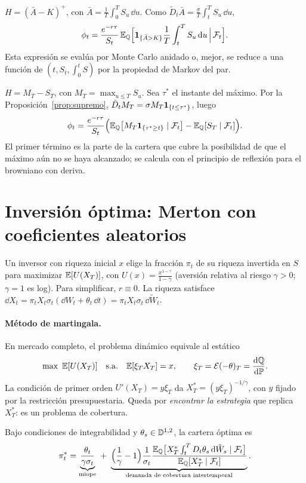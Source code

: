 \begin{ejemplo}[Asiática]
$H=(\bar A-K)^+$, con $\bar A=\frac1T\int_0^TS_u\,\dd u$. Como $\tilde D_t\bar A=\frac\sigma T\int_t^TS_u\,\dd u$,
\[
  \phi_t=\frac{e^{-r\tau}}{S_t}\,\mathbb{E}_{\mathbb{Q}}\Big[\mathbf{1}_{\{\bar A>K\}}\frac1T\int_t^TS_u\,\mathrm{d} u\,\Big|\,\mathcal{F}_t\Big].
\]
Esta expresión se evalúa por Monte Carlo anidado o, mejor, se reduce a una función de
$(t,S_t,\int_0^tS)$ por la propiedad de Markov del par.
\end{ejemplo}

\begin{ejemplo}
$H=M_T-S_T$, con $M_T=\max_{u\le T}S_u$. Sea $\tau^*$ el instante
del máximo. Por la Proposición~\ref{prop:supremo}, $\tilde D_tM_T=\sigma M_T\mathbf{1}_{\{t\le\tau^*\}}$, luego
\[
  \phi_t=\frac{e^{-r\tau}}{S_t}\Big(\mathbb{E}_{\mathbb{Q}}\big[M_T\mathbf{1}_{\{\tau^*\ge t\}}\mid\mathcal{F}_t\big]-\mathbb{E}_{\mathbb{Q}}[S_T\mid\mathcal{F}_t]\Big).
\]
El primer término es la parte de la cartera que cubre la posibilidad de que el máximo aún no se
haya alcanzado; se calcula con el principio de reflexión para el browniano con deriva.
\end{ejemplo}

\section{Inversión óptima: Merton con coeficientes aleatorios}
Un inversor con riqueza inicial $x$ elige la fracción $\pi_t$ de su riqueza invertida en $S$ para maximizar
$\mathbb{E}[U(X_T)]$, con $U(x)=\frac{x^{1-\gamma}}{1-\gamma}$ (aversión relativa al riesgo $\gamma>0$; $\gamma=1$ es log). Para simplificar,
$r\equiv0$. La riqueza satisface $\dd X_t=\pi_tX_t\sigma_t(\dd W_t+\theta_t\,\dd t)=\pi_tX_t\sigma_t\,\dd\tilde W_t$.

\paragraph{Método de martingala.} En mercado completo, el problema dinámico equivale al estático
\[
  \max\ \E[U(X_T)]\quad\text{s.a.}\quad\E[\xi_TX_T]=x,\qquad\xi_T=\mathcal E(-\theta)_T=\frac{\dd\Q}{\dd\P}.
\]
La condición de primer orden $U'(X_T)=y\xi_T$ da $X_T^*=(y\xi_T)^{-1/\gamma}$, con $y$ fijado por la restricción
presupuestaria. Queda por \emph{encontrar la estrategia} que replica $X_T^*$: es un problema de cobertura.

\begin{teorema}\label{teo:ocone-karatzas}
Bajo condiciones de integrabilidad y $\theta_s\in\mathbb{D}^{1,2}$, la cartera
óptima es
\[
  \pi_t^*=\underbrace{\frac{\theta_t}{\gamma\sigma_t}}_{\text{miope}}\ +\ \underbrace{\Big(\frac1\gamma-1\Big)\frac1{\sigma_t}\frac{\E_\Q\big[X_T^*\int_t^TD_t\theta_s\,\dd\tilde W_s\mid\F_t\big]}{\E_\Q[X_T^*\mid\F_t]}}_{\text{demanda de cobertura intertemporal}}.
\]
\end{teorema}

